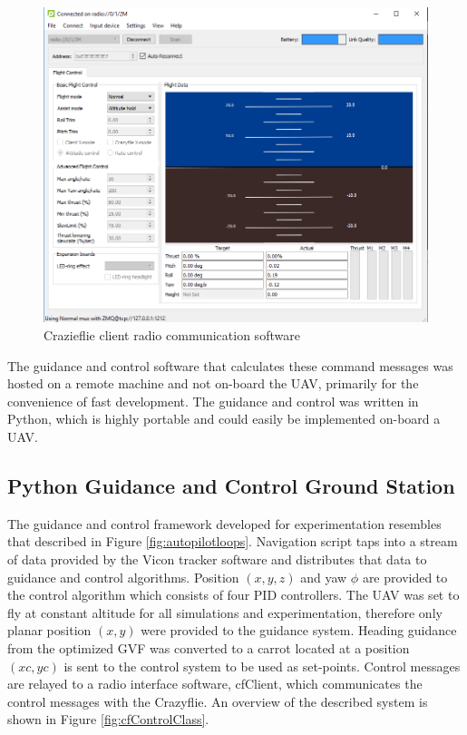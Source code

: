 \documentclass[numbered,pdftex]{ohio-etd}
\begin{document}
\begin{figure}[H]
	\centering
	\includegraphics[trim=0 0 0 0,clip,width=12cm]{PaperFigures/Methods/cfClient}
	\caption{Crazieflie client radio communication software}
	\label{fig:cfClient}
\end{figure}

The guidance and control software that calculates these command messages was hosted on a remote machine and not on-board the UAV, primarily for the convenience of fast development. The guidance and control was written in Python, which is highly portable and could easily be implemented on-board a UAV. 




\subsection{Python Guidance and Control Ground Station}

The guidance and control framework developed for experimentation resembles that described in Figure \ref{fig:autopilotloops}. Navigation script taps into a stream of data provided by the Vicon tracker software and distributes that data to guidance and control algorithms. Position $(x,y,z)$ and yaw $\phi$ are provided to the control algorithm which consists of four PID controllers. The UAV was set to fly at constant altitude for all simulations and experimentation, therefore only planar position $(x,y)$ were provided to the guidance system. Heading guidance from the optimized GVF was converted to a carrot located at a position $(xc,yc)$ is sent to the control system to be used as set-points. Control messages are relayed to a radio interface software, cfClient, which communicates the control messages with the Crazyflie. An overview of the described system is shown in Figure \ref{fig:cfControlClass}.
\end{document}
